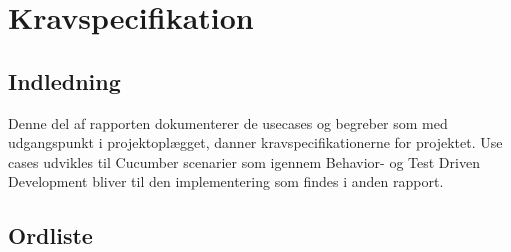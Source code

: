\section{Kravspecifikation}
\subsection{Indledning}
Denne del af rapporten dokumenterer de usecases og begreber som med udgangspunkt i projektoplægget, danner kravspecifikationerne for projektet. Use cases udvikles til Cucumber scenarier som igennem Behavior- og Test Driven Development bliver til den implementering som findes i anden rapport.
\subsection{Ordliste}
